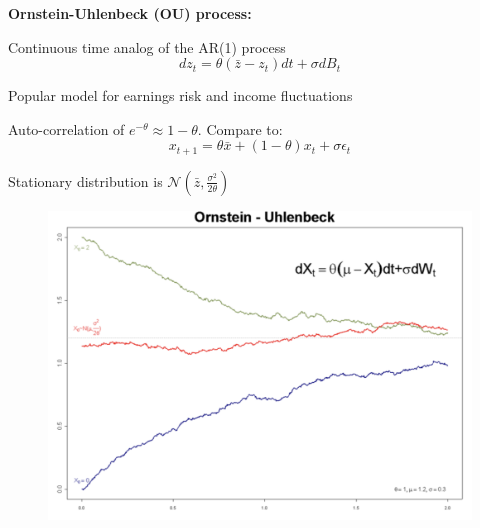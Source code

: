 \documentclass[11pt, aspectratio=169]{beamer}
\newenvironment{witemize}{\itemize\addtolength{\itemsep}{10pt}}{\enditemize}
\begin{document}
\begin{frame}{}

\textbf{Ornstein-Uhlenbeck (OU) process:}
\begin{witemize}
\item Continuous time analog of the AR(1) process
\begin{equation*}
	dz_t = \theta(\bar z - z_t) dt + \sigma dB_t
\end{equation*}

\item Popular model for earnings risk and income fluctuations

\item Auto-correlation of $e^{-\theta} \approx 1-\theta$. Compare to:
\begin{equation*}
	x_{t+1} = \theta \bar x + (1-\theta) x_t + \sigma \epsilon_t
\end{equation*}

\item Stationary distribution is $\mathcal N(\bar z, \frac{\sigma^2}{2\theta} )$

\end{witemize}
\end{frame}


\begin{frame}{}
	\begin{figure}
		\includegraphics[scale=0.3]{./Brownian7}
	\end{figure}
\end{frame}
\end{document}
